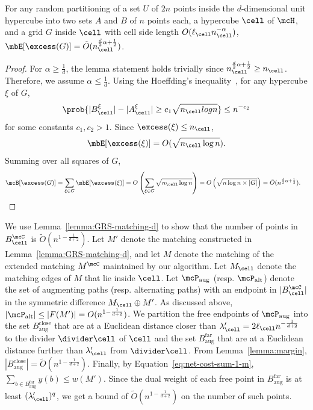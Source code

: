 \begin{lemma}\label{lemma:convergence_excess-d}
    For any random partitioning of a set $U$ of $2n$ points inside the $d$-dimensional unit hypercube into two sets $A$ and $B$ of $n$ points each, a hypercube $\cell$ of $\mcH$, and a grid $G$ inside $\cell$ with cell side length $O(\ell_\cell n_\cell^{-\alpha})$, $\mbE[\excess(G)]= \tilde{O}(n_\cell^{\frac{d}{2}\alpha + \frac{1}{2}})$. 
\end{lemma}
\begin{proof}
    For $\alpha\ge \frac{1}{d}$, the lemma statement holds trivially since $n_\cell^{\frac{d}{2}\alpha+\frac{1}{2}} \ge n_\cell$. Therefore, we assume $\alpha\le \frac{1}{d}$.
    Using the Hoeffding’s inequality~\cite{hoeffding1994probability}, for any hypercube $\xi$ of $G$,
    \begin{equation*}
        \prob{|B_\cell^\xi| - |A_\cell^\xi|\ge c_1\sqrt{n_\cell log n}}\le n^{-c_2}\label{eq:excess-d}
    \end{equation*}
    for some constants $c_1, c_2 > 1$. Since $\excess(\xi)\le n_\cell$, 
    \begin{equation*}
        \mbE[\excess(\xi)]= O(\sqrt{n_\cell\log n}).
    \end{equation*}
    Summing over all squares of $G$,
    \begin{align*}
        \mcB[\excess(G)] = \sum_{\xi\in G} \mbE[\excess(\xi)] &=O\left(\sum_{\xi\in G} \sqrt{n_\cell\log n}\right) = O\left(\sqrt{n\log n\times |G|}\right) = \tilde{O}(n^{\frac{d}{2}\alpha+\frac{1}{2}}).\label{eq:excess-dense-d}
    \end{align*}
\end{proof}


We use Lemma~\ref{lemma:GRS-matching-d} to show that the number of points in $B_\cell^\mcC$ is $\tilde{O}(n^{1-\frac{1}{d+2}})$. Let $M'$ denote the matching constructed in Lemma~\ref{lemma:GRS-matching-d}, and let $M$ denote the matching of the extended matching $M^\mcC$ maintained by our algorithm. Let $M_\cell$ denote the matching edges of $M$ that lie inside $\cell$. 
Let $\mcP_{\mathrm{aug}}$ (resp. $\mcP_{\mathrm{alt}}$) denote the set of augmenting paths (resp. alternating paths) with an endpoint in $|B_\cell^\mcC|$ in the symmetric difference $M_\cell\oplus M'$.
As discussed above, $|\mcP_{\mathrm{alt}}|\le |F(M')|=O(n^{1-\frac{1}{d+2}})$. 
We partition the free endpoints of $\mcP_{\mathrm{aug}}$ into the set $B^{\mathrm{close}}_{\mathrm{aug}}$ that are at a Euclidean distance closer than $\lambda'_\cell=2\ell_\cell n^{-\frac{1}{d+2}}$ to the divider $\divider\cell$ of $\cell$ and the set $B^{\mathrm{far}}_{\mathrm{aug}}$ that are at a Euclidean distance further than $\lambda'_\cell$ from $\divider\cell$. From Lemma~\ref{lemma:margin},  $|B^{\mathrm{close}}_{\mathrm{aug}}|=\tilde{O}(n^{1-\frac{1}{d+2}})$. Finally, by Equation~\eqref{eq:net-cost-sum-1-m}, $\sum_{b\in B^{\mathrm{far}}_{\mathrm{aug}}}y(b) \le w(M')$. Since the dual weight of each free point in $B^{\mathrm{far}}_{\mathrm{aug}}$ is at least $(\lambda'_\cell)^q$, we get a bound of $\tilde{O}(n^{1-\frac{1}{d+2}})$ on the number of such points. 

